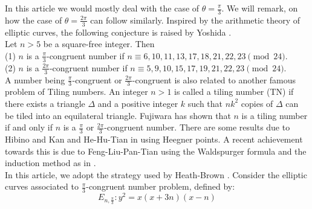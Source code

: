\documentclass[11pt]{article}
\begin{document}
\noindent In this article we would mostly deal with the case of $\theta = \frac{\pi}{3}$. We will remark, on how the case of $\theta = \frac{2\pi}{3}$ can follow similarly.  Inspired by the arithmetic theory of elliptic curves,  the following conjecture is raised by Yoshida \cite{Yoshida}.
\\

\label{theta-congruent-conjecture}
Let $n >5$ be a square-free integer. Then \\
(1) $n$ is a $\frac{\pi}{3}$-congruent number if  $n\equiv 6,10, 11, 13, 17, 18, 21, 22, 23 \pmod{24}$.\\
(2) $n$ is a $\frac{2\pi}{3}$-congruent number if  $n \equiv 5, 9, 10, 15, 17, 19, 21, 22, 23 \pmod{24}$.\\


\noindent A number being $\frac{\pi}{3}$-congruent or  $\frac{2\pi}{3}$-congruent is also related to another famous problem of Tiling numbers.  An integer \( n > 1 \) is called a tiling number (TN) if there exists a triangle \( \Delta \) and a positive integer \( k \) such that \( nk^2 \) copies of \( \Delta \) can be tiled into an equilateral triangle.  Fujiwara \cite{Fujiwara} has shown that $n$ is a tiling number if and only if $n$ is a $\frac{\pi}{3}$ or  $\frac{2\pi}{3}$-congruent number. There are some results due to Hibino and Kan \cite{HK} and 
He-Hu-Tian in \cite{HHT21} using Heegner points.  A recent achievement towards this is due to 
Feng-Liu-Pan-Tian \cite{FLPT} using the Waldspurger formula and the induction method as in \cite{TYZ17}.
\\

\noindent In this article, we adopt the strategy used by Heath-Brown \cite{HeathBrown}.  Consider the elliptic curves associated to $\frac{\pi}{3}$-congruent number problem, defined by:
$$E_{n,\frac{\pi}{3}} :  y^{2} = x(x+3n)(x-n)$$     
\end{document}

